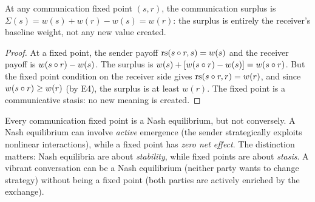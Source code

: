 \begin{theorem}
\label{thm:fixed-zero-surplus}
At any communication fixed point $(s, r)$, the communication surplus is
$\Sigma(s) = w(s) + w(r) - w(s) = w(r)$: the surplus is entirely the
receiver's baseline weight, not any new value created.
\end{theorem}

\begin{proof}
At a fixed point, the sender payoff $\mathrm{rs}(s \circ r, s) = w(s)$ and the
receiver payoff is $w(s \circ r) - w(s)$. The surplus is
$w(s) + [w(s \circ r) - w(s)] = w(s \circ r)$. But the fixed point
condition on the receiver side gives $\mathrm{rs}(s \circ r, r) = w(r)$, and since
$w(s \circ r) \geq w(r)$ (by E4), the surplus is at least $w(r)$. The
fixed point is a communicative stasis: no new meaning is created.
\end{proof}

\begin{remark}
Every communication fixed point is a Nash equilibrium, but not conversely.
A Nash equilibrium can involve \emph{active} emergence (the sender
strategically exploits nonlinear interactions), while a fixed point has
\emph{zero net effect}. The distinction matters: Nash equilibria are
about \emph{stability}, while fixed points are about \emph{stasis}.
A vibrant conversation can be a Nash equilibrium (neither party wants to
change strategy) without being a fixed point (both parties are actively
enriched by the exchange).
\end{remark}

